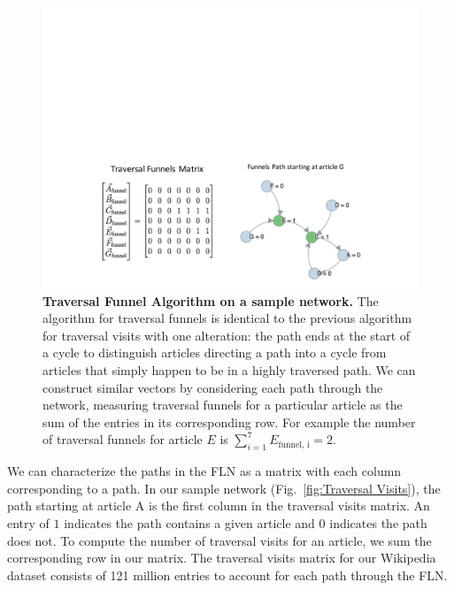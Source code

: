 \documentclass[11pt]{report}
\begin{document}
\begin{figure}[tp!]
  \includegraphics[width=\columnwidth]{graphics/traversal_funnel_algo_figure.pdf}
  \caption{
    \textbf{Traversal Funnel Algorithm on a sample network.}
  The algorithm for traversal funnels is identical to the previous algorithm for traversal visits with one alteration: the path ends at the start of a cycle to distinguish articles directing a path into a cycle from articles that simply happen to be in a highly traversed path. We can construct similar vectors by considering each path through the network, measuring traversal funnels for a particular article as the sum of the entries in its corresponding row. For example
  the number of traversal funnels for article $E$ is 
  $\sum_{i=1}^7 E_{\text{funnel, i}} = 2$.}
  \label{fig:Traversal Funnels}

\end{figure}

We can characterize the paths in the FLN as a matrix with each column corresponding to a path. In our sample network 
(Fig.~\ref{fig:Traversal Visits}), the path starting at article A is the 
first column in the traversal visits matrix. 
An entry of $1$ indicates the path contains a given article and 
$0$ indicates the path does not.
To compute the number of traversal visits for an article, we sum the corresponding row in our matrix.
The traversal visits matrix for 
our Wikipedia dataset consists of 121 million entries to account for each path through the FLN. 
\end{document}
